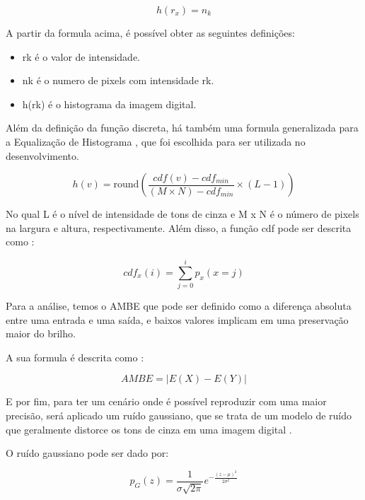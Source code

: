 \documentclass[conference]{IEEEtran}
\begin{document}
\begin{equation}
h(r_{x}) = n_{k}
\end{equation}

A partir da formula acima, é possível obter as seguintes definições:

\begin{itemize}
\item rk é o valor de intensidade.
\item nk é o numero de pixels com intensidade rk.
\item h(rk) é o histograma da imagem digital.
\end{itemize}

Além da definição da função discreta, há também uma formula generalizada para a Equalização de Histograma \cite{b13}, que foi escolhida para ser utilizada no desenvolvimento. 

\begin{equation}
h(v)=\mathrm {round} \left({\frac {cdf(v)-cdf_{min}}{(M\times N)-cdf_{min}}}\times (L-1)\right)
\end{equation}

No qual L é o nível de intensidade de tons de cinza e M x N é o número de pixels na largura e altura, respectivamente. Além disso, a função cdf pode ser descrita como \cite{b13}:

\begin{equation}
cdf_{x}(i)=\sum _{j=0}^{i}p_{x}(x=j)
\end{equation}

Para a análise, temos o AMBE que pode ser definido como a diferença absoluta entre uma entrada e uma saída, e baixos valores implicam em uma preservação maior do brilho. 

A sua formula é descrita como \cite{b12}:

\begin{equation}
AMBE = |E(X) - E(Y)|     
\end{equation}

E por fim, para ter um cenário onde é possível reproduzir com uma maior precisão, será aplicado um ruído gaussiano, que se trata de um modelo de ruído que geralmente distorce os tons de cinza em uma imagem digital \cite{b14}.

O ruído gaussiano pode ser dado por:

\begin{equation}
p_{G}(z)={\frac {1}{\sigma {\sqrt {2\pi }}}}e^{-{\frac {(z-\mu )^{2}}{2\sigma ^{2}}}}
\end{equation}
\end{document}
